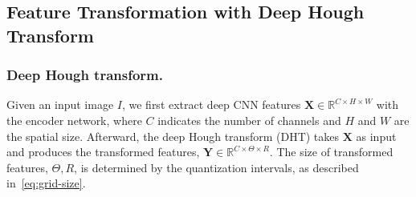 \documentclass[10pt,journal,cspaper,compsoc]{IEEEtran}
\newcommand{\CheckRmv}[1]{}
\newcommand{\CheckRmv}[1]{#1}
\begin{document}
\subsection{Feature Transformation with Deep Hough Transform} \label{sec:dht-dht}

\CheckRmv{
\begin{figure*}[tb]
  \centering
  \hfill
  \subfigure[]{
    \label{fig:DHT}
    \begin{overpic}[height=.18\linewidth]{figures/dht.pdf}
\put(-5, 19){$H$}
      \put(15, 33.3){$W$}
\put(55, 19){$\Theta$}
      \put(75, 33.3){$R$}
\put(20, 43){$\mathbf{X}$}
      \put(79, 43){$\mathbf{Y}$}
      \put(76, 8){$(\hat{\theta}_l, \hat{r}_l)$}
    \end{overpic}
  }\hfill
  \subfigure[]{
    \label{fig:nonlocal}
    \begin{overpic}[width=0.46\linewidth]{figures/nonlocal.pdf}
      \put(19, 39){$W$}
      \put(-6, 20){$H$}
      \put(80, 39){$\Theta$}
      \put(102, 20){$R$}
      \put(45, 24){DHT}
      \put(45, 11){RHT}
      \put(6, -4){feature space}
      \put(65, -4){parametric space}
    \end{overpic}
  }\hfill
  \caption{
    (a): Features along a line in the feature space (blue, left) are
    accumulated to a point $(\hat{r}_l,\hat{\theta}_l)$ in the parametric space (red, right).
    (b): Illustration of the proposed context-aware feature aggregation.
Features of nearby lines in the feature space (left)
    are translated into neighbor points in the parametric space (right).
In the parametric space, a simple $3\times 3$ convolutional operation can
    easily capture contextual information for the central line (orange).
Best viewed in color.
  }
\end{figure*}
}

\subsubsection{Deep Hough transform.}
Given an input image $I$,  we first extract deep CNN features 
$\mathbf{X} \in \mathbb{R} ^ {C \times H \times W}$ with the encoder network,
where $C$ indicates the number of channels and $H$ and $W$ are the spatial size.
Afterward, the deep Hough transform (DHT) takes $\mathbf{X}$ as input and produces
the transformed features, $\mathbf{Y} \in \mathbb{R} ^ {C \times \Theta \times R}$.
The size of transformed features, $\Theta, R$, is determined by the quantization intervals, as
described in~\cref{eq:grid-size}.
\end{document}
